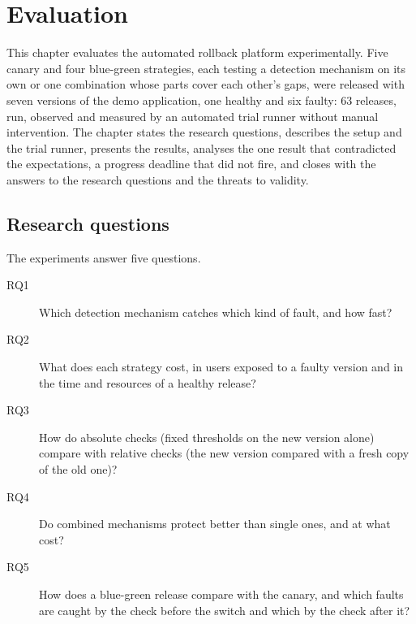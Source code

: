 \chapter{Evaluation}
\label{sec:Evaluation}
\providecommand{\miss}{$\times$}

This chapter evaluates the automated rollback platform experimentally. Five canary and four blue-green strategies, each testing a detection mechanism on its own or one combination whose parts cover each other's gaps, were released with seven versions of the demo application, one healthy and six faulty: 63 releases, run, observed and measured by an automated trial runner without manual intervention. The chapter states the research questions, describes the setup and the trial runner, presents the results, analyses the one result that contradicted the expectations, a progress deadline that did not fire, and closes with the answers to the research questions and the threats to validity.

\section{Research questions}
\label{sec:EvalQuestions}
The experiments answer five questions.

\begin{description}
	\item[RQ1] Which detection mechanism catches which kind of fault, and how fast?
	\item[RQ2] What does each strategy cost, in users exposed to a faulty version and in the time and resources of a healthy release?
	\item[RQ3] How do absolute checks (fixed thresholds on the new version alone) compare with relative checks (the new version compared with a fresh copy of the old one)?
	\item[RQ4] Do combined mechanisms protect better than single ones, and at what cost?
	\item[RQ5] How does a blue-green release compare with the canary, and which faults are caught by the check before the switch and which by the check after it?
\end{description}

